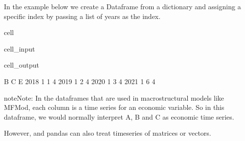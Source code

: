 \documentclass[letterpaper,10pt,english]{jupyterBook}
\begin{document}
\sphinxAtStartPar
In the example below we create a Dataframe from a dictionary and assigning a specific index by passing a list of years as the index.

\begin{sphinxuseclass}{cell}\begin{sphinxVerbatimInput}

\begin{sphinxuseclass}{cell_input}
\begin{sphinxVerbatim}[commandchars=\\\{\}]
   \PYG{p}{[}\PYG{p}{]}\PYG{p}{[}\PYG{p}{]}\PYG{p}{[}\PYG{p}{]}\PYG{p}{[}\PYG{p}{]}
\end{sphinxVerbatim}

\end{sphinxuseclass}\end{sphinxVerbatimInput}
\begin{sphinxVerbatimOutput}

\begin{sphinxuseclass}{cell_output}
\begin{sphinxVerbatim}[commandchars=\\\{\}]
      B  C  E
2018  1  1  4
2019  1  2  4
2020  1  3  4
2021  1  6  4
\end{sphinxVerbatim}

\end{sphinxuseclass}\end{sphinxVerbatimOutput}

\end{sphinxuseclass}
\begin{sphinxadmonition}{note}{Note:}
\sphinxAtStartPar
In the dataframes that are used in macrostructural models like MFMod, each  column is a  time series for an economic variable. So in this dataframe, we would normally interpret A, B and C as economic time series.

\sphinxAtStartPar
However,  and pandas can also treat timeseries of matrices or vectors.
\end{sphinxadmonition}
\end{document}
